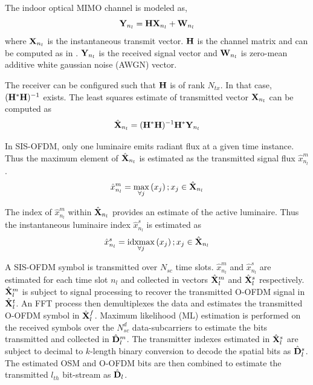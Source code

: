 \documentclass[12pt,letterpaper,onecolumn]{article} %
\newcommand{\vm}[1]{{\bf{#1}}}
\newcommand{\idxmax}{\operatornamewithlimits{idxmax}}
\begin{document}
The indoor optical MIMO channel is modeled as,
\begin{equation}
	\label{eqChannel}
	\vm{Y}_{n_l} = \vm{H}\vm{X}_{n_l} + \vm{W}_{n_l}
\end{equation}
where $\vm{X}_{n_l}$ is the instantaneous transmit vector. $\vm{H}$ is the channel matrix and can be computed as in \cite{but13a}. $\vm{Y}_{n_l}$ is the received signal vector and $\vm{W}_{n_l}$ is zero-mean additive white gaussian noise (AWGN) vector.

The receiver can be configured such that $\vm{H}$ is of rank $N_{tx}$. In that case, $(\vm{H}^{*}\vm{H})^{-1}$ exists. The least squares estimate of transmitted vector $\vm{X}_{n_l}$ can be computed as
\begin{equation}
	\label{eqXls}
	\hat{\vm{X}}_{n_l} = (\vm{H}^{*}\vm{H})^{-1}\vm{H}^{*}\vm{Y}_{n_l}
\end{equation}

In SIS-OFDM, only one luminaire emits radiant flux at a given time instance. Thus the maximum element of $\hat{\vm{X}}_{n_l}$ is estimated as the transmitted signal flux $\hat{x}^{m}_{n_l}$.
\begin{equation}
	\label{eqxhsym}
	\hat{x}^{m}_{n_l} = \max_{\forall j}\left(x_{j}\right); x_{j}\in\hat{\vm{X}}_{n_l}
\end{equation}

The index of $\hat{x}^{m}_{n_l}$ within $\hat{\vm{X}}_{n_l}$ provides an estimate of the active luminaire. Thus the instantaneous luminaire index $\hat{x}^{s}_{n_l}$ is estimated as
\begin{equation}
	\label{eqxhtx}
	\hat{x}^{s}_{n_l} = \idxmax_{\forall j}\left(x_{j}\right); x_{j}\in\hat{\vm{X}}_{n_l}
\end{equation}

A SIS-OFDM symbol is transmitted over $N_{sc}$ time slots. $\hat{x}^{m}_{n_l}$ and $\hat{x}^{s}_{n_l}$ are estimated for each time slot $n_l$ and collected in vectors $\hat{\vm{X}}^m_l$ and $\hat{\vm{X}}^s_l$ respectively. $\hat{\vm{X}}^m_l$ is subject to signal processing to recover the transmitted O-OFDM signal in $\hat{\vm{X}}^t_l$. An FFT process then demultiplexes the data and estimates the transmitted O-OFDM symbol in $\hat{\vm{X}}^f_l$. Maximum likelihood (ML) estimation is performed on the received symbols over the $N_{sc}^d$ data-subcarriers to estimate the bits transmitted and collected in $\hat{\vm{D}}^m_l$. The transmitter indexes estimated in $\hat{\vm{X}}^s_l$ are subject to decimal to $k$-length binary conversion to decode the spatial bits as $\hat{\vm{D}}^s_l$. The estimated OSM and O-OFDM bits are then combined to estimate the transmitted $l_{th}$ bit-stream as $\hat{\vm{D}}_l$.
\end{document}
